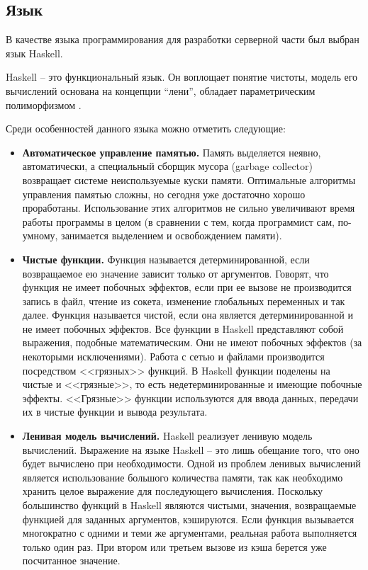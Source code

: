 \subsection{Язык}
В качестве языка программирования для разработки серверной части был выбран язык Haskell. 

Haskell – это функциональный язык. Он воплощает понятие чистоты, модель его вычислений основана на концепции “лени”, обладает параметрическим полиморфизмом \cite{haskell}. 

Среди особенностей данного языка можно отметить следующие:
\begin{itemize}
	\item \textbf{Автоматическое управление памятью.} Память выделяется неявно, автоматически, а специальный сборщик мусора (garbage collector) возвращает системе неиспользуемые куски памяти. Оптимальные алгоритмы управления памятью сложны, но сегодня уже достаточно хорошо проработаны. Использование этих алгоритмов не сильно увеличивают время работы программы в целом (в сравнении с тем, когда программист сам, по-умному, занимается выделением и освобождением памяти).
	
	\item \textbf{Чистые функции.} Функция называется детерминированной, если возвращаемое ею значение зависит только от аргументов. Говорят, что функция не имеет побочных эффектов, если при ее вызове не производится запись в файл, чтение из сокета, изменение глобальных переменных и так далее. Функция называется чистой, если она является детерминированной и не имеет побочных эффектов. Все функции в Haskell представляют собой выражения, подобные математическим. Они не имеют побочных эффектов (за некоторыми исключениями). Работа с сетью и файлами производится посредством <<грязных>> функций. В Haskell функции поделены на чистые и <<грязные>>, то есть недетерминированные и имеющие побочные эффекты. <<Грязные>> функции используются для ввода данных, передачи их в чистые функции и вывода результата.
	
	\item \textbf{Ленивая модель вычислений.} Haskell реализует ленивую модель вычислений. Выражение на языке Haskell – это лишь обещание того, что оно будет вычислено при необходимости. Одной из проблем ленивых вычислений является использование большого количества памяти, так как необходимо хранить целое выражение для последующего вычисления. Поскольку большинство функций в Haskell являются чистыми, значения, возвращаемые функцией для заданных аргументов, кэшируются. Если функция вызывается многократно с одними и теми же аргументами, реальная работа выполняется только один раз. При втором или третьем вызове из кэша берется уже посчитанное значение.
	

\end{itemize}
